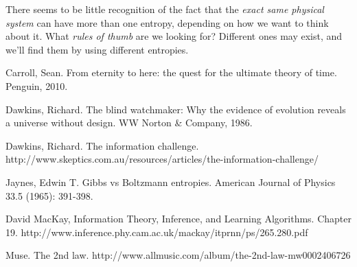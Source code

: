 \documentclass[a4paper, 12pt]{article}
\begin{document}
There seems to be little recognition of the fact
that the {\em exact same physical system}
can have more than one entropy, depending on how we want to think about it.
What {\em rules of thumb} are we looking for? Different ones may exist, and
we'll find them by using different entropies.

\begin{thebibliography}{999} %
Carroll, Sean. From eternity to here: the quest for the ultimate theory of time. Penguin, 2010.

Dawkins, Richard. The blind watchmaker: Why the evidence of evolution reveals a universe without design. WW Norton \& Company, 1986.

Dawkins, Richard. The information challenge.
http://www.skeptics.com.au/resources/articles/the-information-challenge/

Jaynes, Edwin T. Gibbs vs Boltzmann entropies. American Journal of Physics 33.5 (1965): 391-398.

David MacKay, Information Theory, Inference, and Learning Algorithms.
Chapter 19.
http://www.inference.phy.cam.ac.uk/mackay/itprnn/ps/265.280.pdf

Muse. The 2nd law.
http://www.allmusic.com/album/the-2nd-law-mw0002406726
\end{thebibliography}
\end{document}
